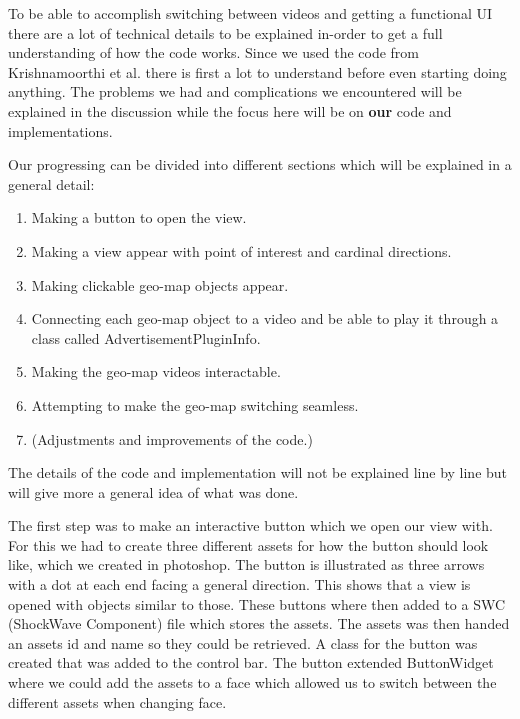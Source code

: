 \documentclass[9pt,a4paper]{acmproc}
\begin{document}
To be able to accomplish switching between videos and getting a functional UI there are a lot of technical details to be explained in-order to get a full understanding of how the code works. Since we used the code from Krishnamoorthi et al.\cite{qualbranch} there is first a lot to understand before even starting doing anything. The problems we had and complications we encountered will be explained in the discussion while the focus here will be on \textbf{our} code and implementations. 

Our progressing can be divided into different sections which will be explained in a general detail:

\begin{enumerate}
\item Making a button to open the view.

\item Making a view appear with point of interest and cardinal directions.

\item Making clickable geo-map objects appear.

\item Connecting each geo-map object to a video and be able to play it through a class called AdvertisementPluginInfo.

\item Making the geo-map videos interactable.

\item Attempting to make the geo-map switching seamless.

\item (Adjustments and improvements of the code.)
\end{enumerate}

The details of the code and implementation will not be explained line by line but will give more a general idea of what was done.

The first step was to make an interactive button which we open our view with. For this we had to create three different assets for how the button should look like, which we created in photoshop. The button is illustrated as three arrows with a dot at each end facing a general direction. This shows that a view is opened with objects similar to those. These buttons where then added to a SWC (ShockWave Component) file which stores the assets. The assets was then handed an assets id and name so they could be retrieved. A class for the button was created that was added to the control bar. The button extended ButtonWidget where we could add the assets to a face which allowed us to switch between the different assets when changing face. 
\end{document}
